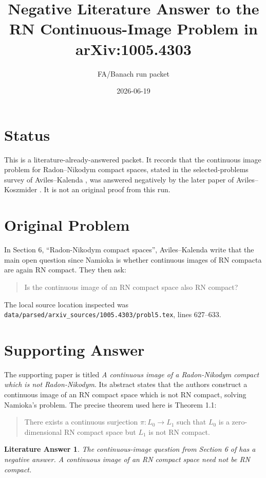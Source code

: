 \documentclass[11pt]{article}
\title{Negative Literature Answer to the RN Continuous-Image Problem in arXiv:1005.4303}
\author{FA/Banach run packet}
\date{2026-06-19}
\newtheorem*{theorem}{Literature Answer}
\begin{document}
\maketitle

\section*{Status}

This is a literature-already-answered packet. It records that the continuous
image problem for Radon--Nikodym compact spaces, stated in the selected-problems
survey of Aviles--Kalenda \cite{AK}, was answered negatively by the later paper
of Aviles--Koszmider \cite{AvKos}. It is not an original proof from this run.

\section*{Original Problem}

In Section 6, ``Radon-Nikodym compact spaces'', Aviles--Kalenda write that the
main open question since Namioka is whether continuous images of RN compacta are
again RN compact. They then ask:

\begin{quote}
Is the continuous image of an RN compact space also RN compact?
\end{quote}

The local source location inspected was
\texttt{data/parsed/arxiv\_sources/1005.4303/probl5.tex}, lines 627--633.

\section*{Supporting Answer}

The supporting paper \cite{AvKos} is titled
\emph{A continuous image of a Radon-Nikodym compact which is not
Radon-Nikodym}. Its abstract states that the authors construct a continuous
image of an RN compact space which is not RN compact, solving Namioka's problem.
The precise theorem used here is Theorem 1.1:

\begin{quote}
There exists a continuous surjection \(\pi:L_0\to L_1\) such that \(L_0\) is
a zero-dimensional RN compact space but \(L_1\) is not RN compact.
\end{quote}

\begin{theorem}
The continuous-image question from Section 6 of \cite{AK} has a negative
answer. A continuous image of an RN compact space need not be RN compact.
\end{theorem}
\end{document}
